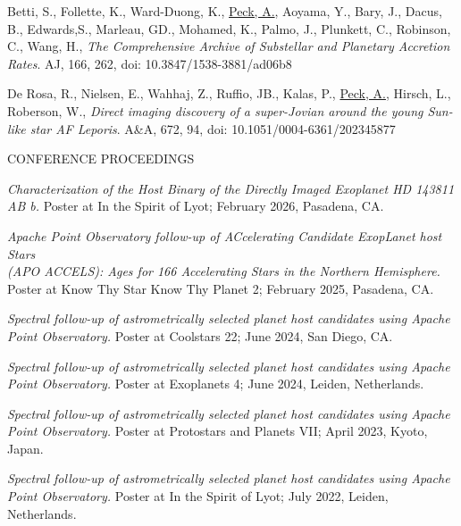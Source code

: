 \hangindent=0.5in \noindent  Betti, S., Follette, K., Ward-Duong, K.,  \underline{Peck, A.}, Aoyama, Y., Bary, J., Dacus, B., Edwards,S.,  Marleau, GD., Mohamed, K., Palmo, J., Plunkett, C., Robinson, C., Wang, H., \textit{The Comprehensive Archive of Substellar and Planetary Accretion Rates}. AJ, 166, 262, doi: 10.3847/1538-3881/ad06b8

\hangindent=0.5in \noindent  De Rosa, R., Nielsen, E., Wahhaj, Z., Ruffio, JB., Kalas, P., \underline{Peck, A.}, Hirsch, L., Roberson, W., \textit{Direct imaging discovery of a super-Jovian around the young Sun-like star AF Leporis}. A\&A, 672, 94, doi: 10.1051/0004-6361/202345877

\begin{center}
CONFERENCE PROCEEDINGS
\end{center}

\textit{Characterization of the Host Binary of the Directly Imaged Exoplanet HD 143811 AB b.} Poster at In the Spirit of Lyot; February 2026, Pasadena, CA. 
  
\textit{Apache Point Observatory follow-up of ACcelerating Candidate ExopLanet host Stars \\(APO ACCELS): Ages for 166 Accelerating Stars in the Northern Hemisphere.} Poster at Know Thy Star Know Thy Planet 2; February 2025, Pasadena, CA.


 
\textit{Spectral follow-up of astrometrically selected planet host candidates using Apache Point Observatory.} Poster at Coolstars 22; June 2024, San Diego, CA.



\textit{Spectral follow-up of astrometrically selected planet host candidates using Apache Point Observatory.} Poster at Exoplanets 4; June 2024, Leiden, Netherlands.


\textit{Spectral follow-up of astrometrically selected planet host candidates using Apache Point Observatory.} Poster at Protostars and Planets VII; April 2023, Kyoto, Japan.
 
\textit{Spectral follow-up of astrometrically selected planet host candidates using Apache Point Observatory.} Poster at In the Spirit of Lyot; July 2022, Leiden, Netherlands.
 







